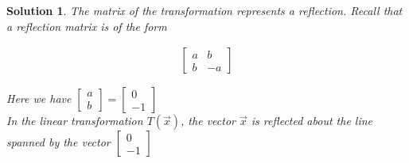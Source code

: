 \documentclass{article}
\newtheorem*{solution}{Solution}
\begin{document}
\begin{solution}
The matrix of the transformation represents a reflection. Recall that a reflection matrix is of the form 

\begin{align*}
\begin{bmatrix}
a & b \\
b & -a
\end{bmatrix}
\end{align*}

Here we have $\begin{bmatrix} a \\ b \end{bmatrix} = \begin{bmatrix} 0 \\ -1 \end{bmatrix}$ \\

In the linear transformation $T(\vec{x})$, the vector $\vec{x}$ is reflected about the line spanned by the vector $\begin{bmatrix} 0 \\ -1 \end{bmatrix}$

\end{solution}
\end{document}
